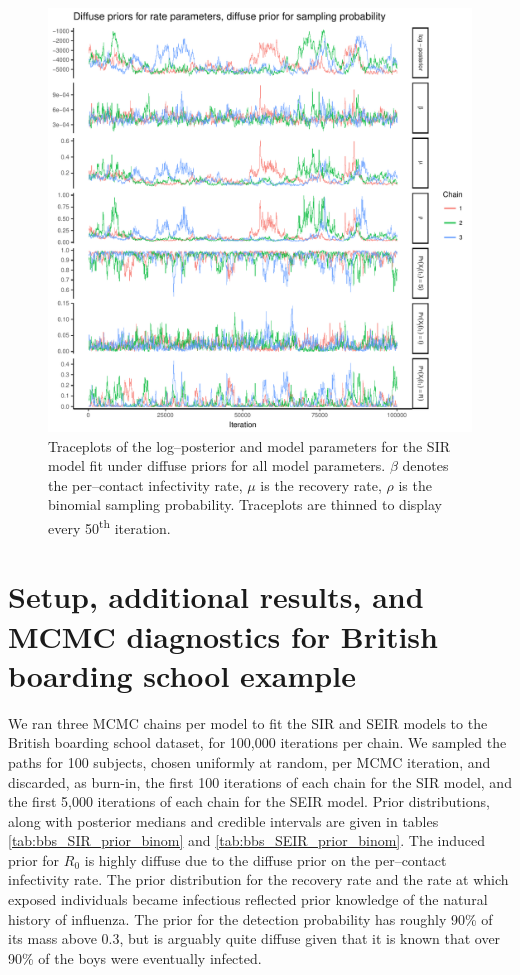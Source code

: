 \begin{figure}[htbp]
	\centering
	\includegraphics[width=0.9\linewidth]{figures/diffuse_diffuse_traceplots.pdf}
	\caption[Simuation 4 MCMC traceplots for SIR model parameters fit under diffuse priors for the measurement process and diffuse priors for rate parameters.]{Traceplots of the log--posterior and model parameters for the SIR model fit under diffuse priors for all model parameters. $ \beta $ denotes the per--contact infectivity rate, $ \mu $ is the recovery rate, $ \rho $ is the binomial sampling probability. Traceplots are thinned to display every 50\textsuperscript{th} iteration.}
	\label{fig:diffuse_diffuse_traces}
\end{figure}

\newpage
\section{Setup, additional results, and MCMC diagnostics for British boarding school example}
\label{sec:bbs_supp}

We ran three MCMC chains per model to fit the SIR and SEIR models to the British boarding school dataset, for 100,000 iterations per chain. We sampled the paths for 100 subjects, chosen uniformly at random, per MCMC iteration, and discarded, as burn-in, the first 100 iterations of each chain for the SIR model, and the first 5,000 iterations of each chain for the SEIR model. Prior distributions, along with posterior medians and credible intervals are given in tables \ref{tab:bbs_SIR_prior_binom} and \ref{tab:bbs_SEIR_prior_binom}. The induced prior for $ R_0 $ is highly diffuse due to the diffuse prior on the per--contact infectivity rate. The prior distribution for the recovery rate and the rate at which exposed individuals became infectious reflected prior knowledge of the natural history of influenza. The prior for the detection probability has roughly 90\% of its mass above 0.3, but is arguably quite diffuse given that it is known that over 90\% of the boys were eventually infected. 


